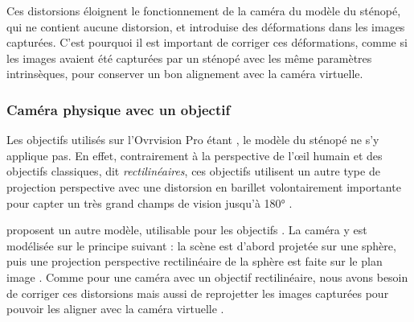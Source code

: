 Ces distorsions éloignent le fonctionnement de la caméra du modèle du sténopé, qui ne contient aucune distorsion, et introduise des déformations dans les images capturées. C'est pourquoi il est important de corriger ces déformations, comme si les images avaient été capturées par un sténopé avec les même paramètres intrinsèques, pour conserver un bon alignement avec la caméra virtuelle.

\subsubsection{Caméra physique avec un objectif }
Les objectifs utilisés sur l'Ovrvision Pro étant , le modèle du sténopé ne s'y applique pas. En effet, contrairement à la perspective de l'\oe il humain et des objectifs classiques, dit \emph{rectilinéaires}, ces objectifs utilisent un autre type de projection perspective avec une distorsion en barillet volontairement importante pour capter un très grand champs de vision jusqu'à \ang{180} .


\cite{Mei2007} proposent un autre modèle, utilisable pour les objectifs . La caméra y est modélisée sur le principe suivant : la scène est d'abord projetée sur une sphère, puis une projection perspective rectilinéaire de la sphère est faite sur le plan image . Comme pour une caméra avec un objectif rectilinéaire, nous avons besoin de corriger ces distorsions mais aussi de reprojetter les images capturées pour pouvoir les aligner avec la caméra virtuelle .


